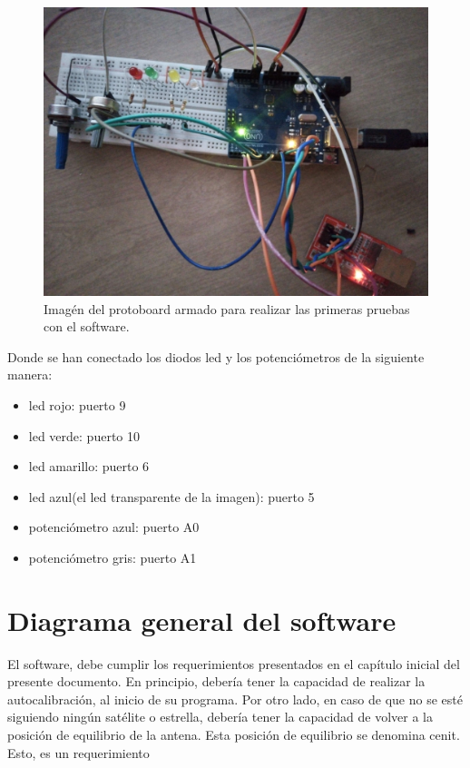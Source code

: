 \begin{figure}[H]
	\centering
	\includegraphics[scale=0.08]{protoboard_1}
	\caption{Imagén del protoboard armado para realizar las primeras pruebas con el software.}
	\label{fig:proto_1}
\end{figure}



\vspace{20mm}
Donde se han conectado los diodos led y los potenciómetros de la siguiente manera: 
\begin{itemize}
	\item led rojo: puerto 9 
	\item led verde: puerto 10 
	\item led amarillo: puerto 6 
	\item led azul(el led transparente de la imagen): puerto 5 
	\item potenciómetro azul: puerto A0 
	\item potenciómetro gris: puerto A1 
	
\end{itemize}


\section{Diagrama general del software}

El software, debe cumplir los requerimientos presentados en el capítulo inicial del presente documento. En principio, debería tener la capacidad de realizar la autocalibración, al inicio de su programa. Por otro lado, en caso  de que no se esté siguiendo ningún satélite o estrella, debería tener la capacidad de volver a la posición de equilibrio de la antena. Esta posición de equilibrio se denomina cenit. Esto, es un requerimiento 

